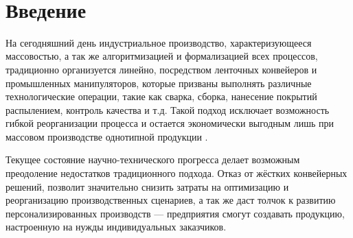 \documentclass[14pt, a4paper]{extreport}
\date{\today}
\title{}
\author{Dema Nikolay}
\begin{document}

\setcounter{page}{1}
\tableofcontents
\newpage 
\ \\
\section*{Введение}
 
На сегодняшний день индустриальное производство, характеризующееся массовостью, а так же алгоритмизацией и формализацией всех процессов, традиционно организуется линейно, посредством ленточных конвейеров и промышленных манипуляторов, которые призваны выполнять различные технологические операции, такие как сварка, сборка, нанесение покрытий распылением, контроль качества и т.д. Такой подход  исключает возможность гибкой реорганизации процесса и остается экономически выгодным лишь при массовом производстве однотипной продукции \cite{Yang}.

Текущее состояние научно-технического прогресса делает возможным преодоление недостатков традиционного подхода. Отказ от жёстких конвейерных решений, позволит значительно снизить затраты на оптимизацию и реорганизацию производственных сценариев, а так же даст толчок к развитию персонализированных производств --- предприятия смогут создавать продукцию, настроенную на нужды индивидуальных заказчиков.
\end{document}
